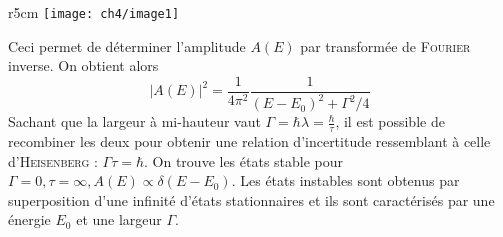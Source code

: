 	\begin{wrapfigure}[11]{r}{5cm}
	\vspace{-5mm}
	\texttt{[image: ch4/image1]}
	\end{wrapfigure}

Ceci permet de déterminer l'amplitude $A(E)$ par transformée de \textsc{Fourier} inverse. On obtient alors
\begin{equation}
|A(E)|^2 = \dfrac{1}{4\pi^2}\dfrac{1}{(E-E_0)^2+\Gamma^2/4}
\end{equation}
Sachant que la largeur à mi-hauteur vaut $\Gamma = \hbar\lambda = \frac{\hbar}{\tau}$, il est possible de 
recombiner les deux pour obtenir une relation d'incertitude ressemblant à celle d'\textsc{Heisenberg} :
$\Gamma \tau = \hbar$. On trouve les états stable pour $\Gamma =0,\tau=\infty, A(E)\propto \delta(E-E_0)$. Les
états instables sont obtenus par superposition d'une infinité d'états stationnaires et ils sont caractérisés
par une énergie $E_0$ et une largeur $\Gamma$.











\newpage
